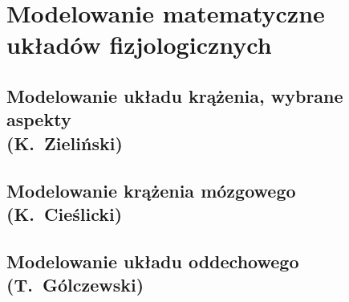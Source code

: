 \documentclass[11pt,a4paper,twoside,openright,final]{memoir}
\begin{document}

	\frontmatter
	
	\begin{KeepFromToc}
		
		\tableofcontents
	\end{KeepFromToc}


	\mainmatter
	\pagestyle{ruled}
		
		\part{Modelowanie matematyczne układów fizjologicznych}
			
			
			
			\chapter[Modelowanie układu krążenia, wybrane aspekty]{Modelowanie układu krążenia, wybrane aspekty\\{\large (K.~Zieliński)}}
			
			\chapter[Modelowanie krążenia mózgowego]{Modelowanie krążenia mózgowego\\{\large (K.~Cieślicki)}}
			
			\chapter[Modelowanie układu oddechowego]{Modelowanie układu oddechowego\\{\large (T.~Gólczewski)}}
			
\end{document}
